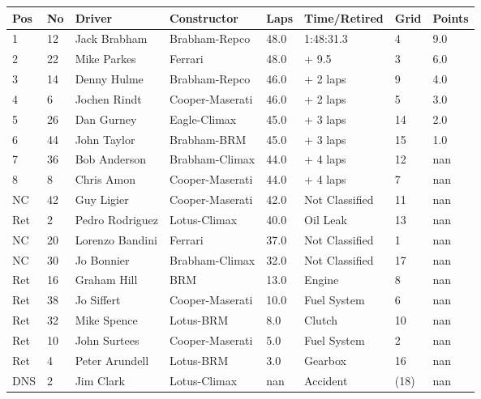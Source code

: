 \documentclass{article}
\begin{document}
\begin{tabular}{llllllll}
\toprule
Pos & No & Driver & Constructor & Laps & Time/Retired & Grid & Points \\
\midrule
1 & 12 & Jack Brabham & Brabham-Repco & 48.0 & 1:48:31.3 & 4 & 9.0 \\
2 & 22 & Mike Parkes & Ferrari & 48.0 & + 9.5 & 3 & 6.0 \\
3 & 14 & Denny Hulme & Brabham-Repco & 46.0 & + 2 laps & 9 & 4.0 \\
4 & 6 & Jochen Rindt & Cooper-Maserati & 46.0 & + 2 laps & 5 & 3.0 \\
5 & 26 & Dan Gurney & Eagle-Climax & 45.0 & + 3 laps & 14 & 2.0 \\
6 & 44 & John Taylor & Brabham-BRM & 45.0 & + 3 laps & 15 & 1.0 \\
7 & 36 & Bob Anderson & Brabham-Climax & 44.0 & + 4 laps & 12 & nan \\
8 & 8 & Chris Amon & Cooper-Maserati & 44.0 & + 4 laps & 7 & nan \\
NC & 42 & Guy Ligier & Cooper-Maserati & 42.0 & Not Classified & 11 & nan \\
Ret & 2 & Pedro Rodriguez & Lotus-Climax & 40.0 & Oil Leak & 13 & nan \\
NC & 20 & Lorenzo Bandini & Ferrari & 37.0 & Not Classified & 1 & nan \\
NC & 30 & Jo Bonnier & Brabham-Climax & 32.0 & Not Classified & 17 & nan \\
Ret & 16 & Graham Hill & BRM & 13.0 & Engine & 8 & nan \\
Ret & 38 & Jo Siffert & Cooper-Maserati & 10.0 & Fuel System & 6 & nan \\
Ret & 32 & Mike Spence & Lotus-BRM & 8.0 & Clutch & 10 & nan \\
Ret & 10 & John Surtees & Cooper-Maserati & 5.0 & Fuel System & 2 & nan \\
Ret & 4 & Peter Arundell & Lotus-BRM & 3.0 & Gearbox & 16 & nan \\
DNS & 2 & Jim Clark & Lotus-Climax & nan & Accident & (18) & nan \\
\bottomrule
\end{tabular}
\end{document}
